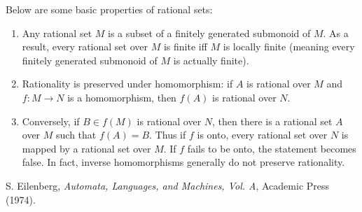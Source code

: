 \documentclass[12pt]{article}
\begin{document}
Below are some basic properties of rational sets:
\begin{enumerate}
\item Any rational set $M$ is a subset of a finitely generated submonoid of $M$.  As a result, every rational set over $M$ is finite iff $M$ is locally finite (meaning every finitely generated submonoid of $M$ is actually finite).
\item Rationality is preserved under homomorphism: if $A$ is rational over $M$ and $f:M\to N$ is a homomorphism, then $f(A)$ is rational over $N$.
\item Conversely, if $B\in f(M)$ is rational over $N$, then there is a rational set $A$ over $M$ such that $f(A)=B$.  Thus if $f$ is onto, every rational set over $N$ is mapped by a rational set over $M$.  If $f$ fails to be onto, the statement becomes false.  In fact, inverse homomorphisms generally do not preserve rationality.
\end{enumerate}

\begin{thebibliography}{8}
 S. Eilenberg, {\em Automata, Languages, and Machines, Vol. A}, Academic Press (1974).
\end{thebibliography}

\end{document}
